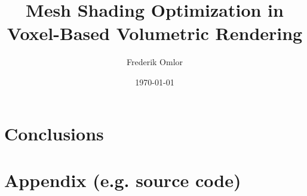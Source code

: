 \documentclass[ a4paper,
                oneside,
                toc=bibliography,
                toc=listof
                ]{scrbook}
\author{Frederik Omlor}
\title{Mesh Shading Optimization in Voxel-Based Volumetric Rendering}
\date{\today}
\begin{document}
 
    \frontmatter
    \makeISWtitle

	\cleardoublepage
	\setcounter{page}{1} %
    \declarationOfOriginality

    

    
    
    \cleardoublepage
    \tableofcontents

    \mainmatter
    
    \nocite{*}

    
    
    
    
    
    
    
    
    
    \chapter{Conclusions}

    
    \cleardoublepage
    \printbibliography
    \cleardoublepage
    
    
    \cleardoublepage
    \listoffigures
    
    \cleardoublepage
    \listoftables
    
    
    
    \appendix
    \chapter{Appendix (e.g. source code)}
\end{document}
